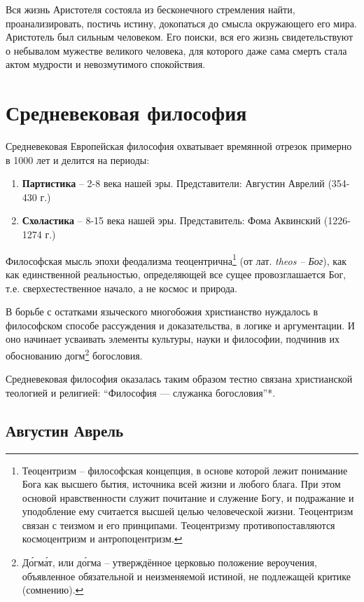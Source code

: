\documentclass[a4paper, 14pt]{extreport}
\begin{document}
Вся жизнь Аристотеля состояла из бесконечного стремления найти,
проанализировать, постичь истину, докопаться до смысла окружающего его
мира. Аристотель был сильным человеком. Его поиски, вся его жизнь
свидетельствуют о небывалом мужестве великого человека, для которого
даже сама смерть стала актом мудрости и невозмутимого спокойствия.

\chapter{Средневековая философия}

Средневековая Европейская философия охватывает времянной отрезок
примерно в 1000 лет и делится на периоды:

\begin{enumerate}
\def\labelenumi{\arabic{enumi}.}

\item
  \textbf{Партистика} -- 2-8 века нашей эры. Представители: Августин
  Аврелий (354-430 г.)
\item
  \textbf{Схоластика} -- 8-15 века нашей эры. Представитель: Фома
  Аквинский (1226-1274 г.)
\end{enumerate}

Философская мысль эпохи феодализма теоцентрична\footnote{Теоцентризм --
  философская концепция, в основе которой лежит понимание Бога как
  высшего бытия, источника всей жизни и любого блага. При этом основой
  нравственности служит почитание и служение Богу, и подражание и
  уподобление ему считается высшей целью человеческой жизни. Теоцентризм
  связан с теизмом и его принципами. Теоцентризму противопоставляются
  космоцентризм и антропоцентризм.} (от лат. \emph{theos -- Бог}), как
как единственной реальностью, определяющей все сущее провозглашается
Бог, т.е. сверхестественное начало, а не космос и природа.

В борьбе с остатками языческого многобожия христианство нуждалось в
философском способе рассуждения и доказательства, в логике и
аргументации. И оно начинает усваивать элементы культуры, науки и
философии, подчинив их обоснованию догм\footnote{До́гма́т, или до́гма --
  утверждённое церковью положение вероучения, объявленное обязательной и
  неизменяемой истиной, не подлежащей критике (сомнению).} богословия.

Средневековая философия оказалась таким образом тестно связана
христианской теологией и религией: ``Философия --- служанка
богословия''*.

\section{Августин Аврель}
\end{document}
